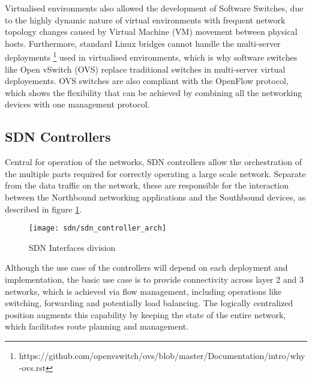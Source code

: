 \begin {enumerate}
\begin{enumerate}
\par Virtualised environments also allowed the development of Software Switches, due to the highly dynamic nature of virtual environments with frequent network 
topology changes caused by Virtual Machine (VM) movement between physical hosts.  Furthermore, standard Linux bridges cannot handle the multi-server
deployments \footnote {https://github.com/openvswitch/ovs/blob/master/Documentation/intro/why-ovs.rst} used in virtualised environments, which is why software 
switches like Open vSwitch (OVS) replace traditional switches in multi-server virtual deployements. OVS switches are also compliant with the OpenFlow
protocol, which shows the flexibility that can be achieved by combining all the networking devices with one management protocol. 

\subsection {SDN Controllers}

Central for operation of the networks, SDN controllers allow the orchestration of the multiple parts required for correctly operating a large scale network.
Separate from the data traffic on the network, these are responsible for the interaction between the Northbound networking applications and the Southbound
devices, as described in figure \ref{fig:sdn_division}.

\begin{figure}[!tbph]
  \centering
  \texttt{[image: sdn/sdn\_controller\_arch]}
  \caption {SDN Interfaces division}
  \label{fig:sdn_division}
\end{figure}

\par Although the use case of the controllers will depend on each deployment and implementation, the basic use case is to provide connectivity across layer 2 and 3
networks, which is achieved via flow management, including operations like switching, forwarding and potentially load balancing. The logically centralized
position augments this capability by keeping the state of the entire network, which facilitates route planning and management. 


\end{enumerate}
\end{enumerate}
